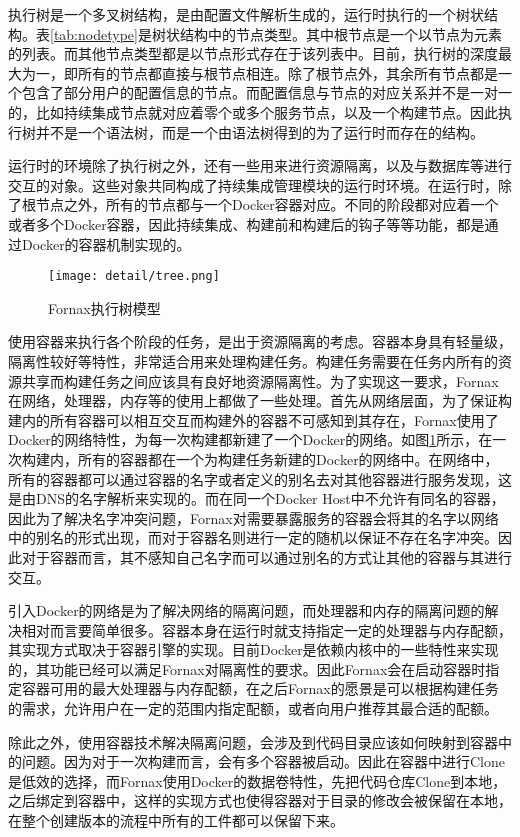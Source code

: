 执行树是一个多叉树结构，是由配置文件解析生成的，运行时执行的一个树状结构。表\ref{tab:nodetype}是树状结构中的节点类型。其中根节点是一个以节点为元素的列表。而其他节点类型都是以节点形式存在于该列表中。目前，执行树的深度最大为一，即所有的节点都直接与根节点相连。除了根节点外，其余所有节点都是一个包含了部分用户的配置信息的节点。而配置信息与节点的对应关系并不是一对一的，比如持续集成节点就对应着零个或多个服务节点，以及一个构建节点。因此执行树并不是一个语法树，而是一个由语法树得到的为了运行时而存在的结构。

运行时的环境除了执行树之外，还有一些用来进行资源隔离，以及与数据库等进行交互的对象。这些对象共同构成了持续集成管理模块的运行时环境。在运行时，除了根节点之外，所有的节点都与一个Docker容器对应。不同的阶段都对应着一个或者多个Docker容器，因此持续集成、构建前和构建后的钩子等等功能，都是通过Docker的容器机制实现的。

\begin{figure}[!htp]
  \centering
  \texttt{[image: detail/tree.png]}
  \caption{Fornax执行树模型}
  \label{fig:tree}
\end{figure}

使用容器来执行各个阶段的任务，是出于资源隔离的考虑。容器本身具有轻量级，隔离性较好等特性，非常适合用来处理构建任务。构建任务需要在任务内所有的资源共享而构建任务之间应该具有良好地资源隔离性。为了实现这一要求，Fornax在网络，处理器，内存等的使用上都做了一些处理。首先从网络层面，为了保证构建内的所有容器可以相互交互而构建外的容器不可感知到其存在，Fornax使用了Docker的网络特性，为每一次构建都新建了一个Docker的网络。如图\ref{fig:tree}所示，在一次构建内，所有的容器都在一个为构建任务新建的Docker的网络中。在网络中，所有的容器都可以通过容器的名字或者定义的别名去对其他容器进行服务发现，这是由DNS的名字解析来实现的。而在同一个Docker Host中不允许有同名的容器，因此为了解决名字冲突问题，Fornax对需要暴露服务的容器会将其的名字以网络中的别名的形式出现，而对于容器名则进行一定的随机以保证不存在名字冲突。因此对于容器而言，其不感知自己名字而可以通过别名的方式让其他的容器与其进行交互。

引入Docker的网络是为了解决网络的隔离问题，而处理器和内存的隔离问题的解决相对而言要简单很多。容器本身在运行时就支持指定一定的处理器与内存配额，其实现方式取决于容器引擎的实现。目前Docker是依赖内核中的一些特性来实现的，其功能已经可以满足Fornax对隔离性的要求。因此Fornax会在启动容器时指定容器可用的最大处理器与内存配额，在之后Fornax的愿景是可以根据构建任务的需求，允许用户在一定的范围内指定配额，或者向用户推荐其最合适的配额。

除此之外，使用容器技术解决隔离问题，会涉及到代码目录应该如何映射到容器中的问题。因为对于一次构建而言，会有多个容器被启动。因此在容器中进行Clone是低效的选择，而Fornax使用Docker的数据卷特性，先把代码仓库Clone到本地，之后绑定到容器中，这样的实现方式也使得容器对于目录的修改会被保留在本地，在整个创建版本的流程中所有的工件都可以保留下来。

